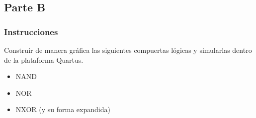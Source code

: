 \documentclass[../procedimientos.tex]{subfiles}
\begin{document}
\subsection{Parte B}
\subsubsection{Instrucciones}
\begin{em}
  Construir de manera gráfica las siguientes compuertas lógicas y simularlas 
  dentro de la plataforma Quartus.
  \begin{itemize}
      \item NAND
      \item NOR
      \item NXOR (y su forma expandida)
  \end{itemize}
\end{em}
\end{document}
